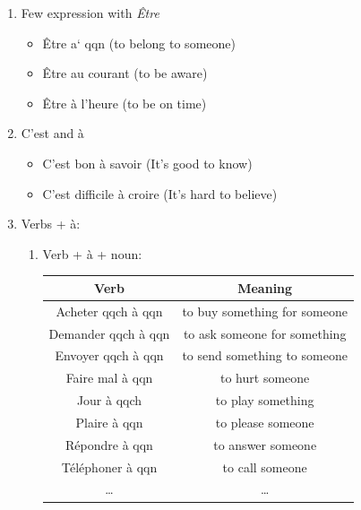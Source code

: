 \documentclass{book}
\begin{document}
\begin{enumerate}
                    \begin{center}
                        à demain (see you tomorrow)
                    \end{center}
                \item Few expression with \textit{Être}
                    \begin{itemize}
                        \item Être a` qqn (to belong to someone)
                        \item Être au courant (to be aware)
                        \item Être à l'heure (to be on time)
                    \end{itemize}
                \item C'est and à
                    \begin{itemize}
                        \item C'est bon à savoir (It's good to know)
                        \item C'est difficile à croire (It's hard to believe)
                    \end{itemize}
                \item Verbs + à:
                    \begin{enumerate}
                        \item Verb + à + noun:
                            \begin{center}
                                \begin{tabular}{|c|c|}
                                    \hline
                                    \textbf{Verb} & \textbf{Meaning}\\
                                    \hline
                                    Acheter qqch à qqn & to buy something for someone\\
                                    Demander qqch à qqn & to ask someone for something\\
                                    Envoyer qqch à qqn & to send something to someone\\
                                    Faire mal à qqn & to hurt someone\\
                                    Jour à qqch & to play something\\
                                    Plaire à qqn & to please someone\\
                                    Répondre à qqn & to answer someone\\
                                    Téléphoner à qqn & to call someone\\
                                    \dots & \dots\\
                                    \hline
                                \end{tabular}
                            \end{center}
                        

\end{enumerate}
\end{enumerate}
\end{document}

